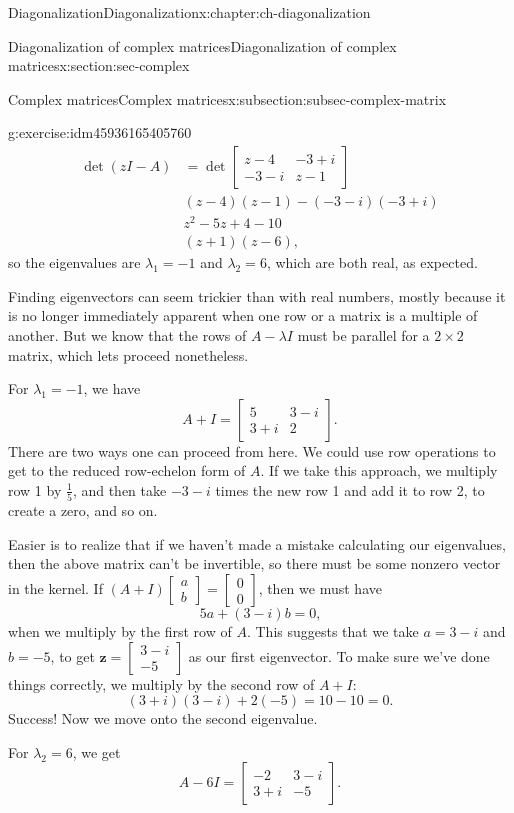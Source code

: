 \documentclass[oneside,10pt,]{book}
\numberwithin{equation}{section}
\newcommand{\bbm}{\begin{bmatrix}}
\newcommand{\ebm}{\end{bmatrix}}
\newcommand{\zz}{\mathbf{z}}
\newcommand{\amp}{&}
\begin{document}
\begin{chapterptx}{Diagonalization}{}{Diagonalization}{}{}{x:chapter:ch-diagonalization}
\begin{sectionptx}{Diagonalization of complex matrices}{}{Diagonalization of complex matrices}{}{}{x:section:sec-complex}
\begin{subsectionptx}{Complex matrices}{}{Complex matrices}{}{}{x:subsection:subsec-complex-matrix}
\begin{inlineexercise}{}{g:exercise:idm45936165405760}
\begin{align*}
\det(zI-A) \amp = \det\bbm z-4 \amp -3+i\\-3-i\amp z-1\ebm\\
\amp (z-4)(z-1)-(-3-i)(-3+i)\\
\amp z^2-5z+4-10\\
\amp (z+1)(z-6)\text{,}
\end{align*}
so the eigenvalues are \(\lambda_1=-1\) and \(\lambda_2=6\), which are both real, as expected.%
\par
Finding eigenvectors can seem trickier than with real numbers, mostly because it is no longer immediately apparent when one row or a matrix is a multiple of another. But we know that the rows of \(A-\lambda I\) must be parallel for a \(2\times 2\) matrix, which lets proceed nonetheless.%
\par
For \(\lambda_1=-1\), we have%
\begin{equation*}
A + I =\bbm 5 \amp 3-i\\3+i\amp 2\ebm\text{.}
\end{equation*}
There are two ways one can proceed from here. We could use row operations to get to the reduced row-echelon form of \(A\). If we take this approach, we multiply row 1 by \(\frac15\), and then take \(-3-i\) times the new row 1 and add it to row 2, to create a zero, and so on.%
\par
Easier is to realize that if we haven't made a mistake calculating our eigenvalues, then the above matrix can't be invertible, so there must be some nonzero vector in the kernel. If \((A+I)\bbm a\\b\ebm=\bbm0\\0\ebm\), then we must have%
\begin{equation*}
5a+(3-i)b=0\text{,}
\end{equation*}
when we multiply by the first row of \(A\). This suggests that we take \(a=3-i\) and \(b=-5\), to get \(\zz = \bbm 3-i\\-5\ebm\) as our first eigenvector. To make sure we've done things correctly, we multiply by the second row of \(A+I\):%
\begin{equation*}
(3+i)(3-i)+2(-5) = 10-10 = 0\text{.}
\end{equation*}
Success! Now we move onto the second eigenvalue.%
\par
For \(\lambda_2=6\), we get%
\begin{equation*}
A-6I = \bbm -2\amp 3-i\\3+i\amp -5\ebm\text{.}
\end{equation*}

\end{inlineexercise}
\end{subsectionptx}
\end{sectionptx}
\end{chapterptx}
\end{document}
